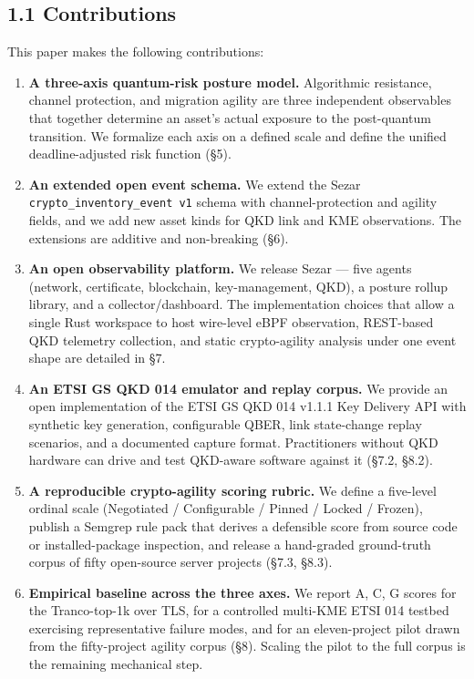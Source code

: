\subsection{1.1 Contributions}\label{contributions}

This paper makes the following contributions:

\begin{enumerate}
\def\labelenumi{\arabic{enumi}.}
\item
  \textbf{A three-axis quantum-risk posture model.} Algorithmic
  resistance, channel protection, and migration agility are three
  independent observables that together determine an asset's actual
  exposure to the post-quantum transition. We formalize each axis on a
  defined scale and define the unified deadline-adjusted risk function
  (§5).
\item
  \textbf{An extended open event schema.} We extend the Sezar
  \texttt{crypto\_inventory\_event\ v1} schema with channel-protection
  and agility fields, and we add new asset kinds for QKD link and KME
  observations. The extensions are additive and non-breaking (§6).
\item
  \textbf{An open observability platform.} We release Sezar --- five
  agents (network, certificate, blockchain, key-management, QKD), a
  posture rollup library, and a collector/dashboard. The implementation
  choices that allow a single Rust workspace to host wire-level eBPF
  observation, REST-based QKD telemetry collection, and static
  crypto-agility analysis under one event shape are detailed in §7.
\item
  \textbf{An ETSI GS QKD 014 emulator and replay corpus.} We provide an
  open implementation of the ETSI GS QKD 014 v1.1.1 Key Delivery API
  with synthetic key generation, configurable QBER, link state-change
  replay scenarios, and a documented capture format. Practitioners
  without QKD hardware can drive and test QKD-aware software against it
  (§7.2, §8.2).
\item
  \textbf{A reproducible crypto-agility scoring rubric.} We define a
  five-level ordinal scale (Negotiated / Configurable / Pinned / Locked
  / Frozen), publish a Semgrep rule pack that derives a defensible score
  from source code or installed-package inspection, and release a
  hand-graded ground-truth corpus of fifty open-source server projects
  (§7.3, §8.3).
\item
  \textbf{Empirical baseline across the three axes.} We report A, C, G
  scores for the Tranco-top-1k over TLS, for a controlled multi-KME ETSI
  014 testbed exercising representative failure modes, and for an
  eleven-project pilot drawn from the fifty-project agility corpus (§8).
  Scaling the pilot to the full corpus is the remaining mechanical step.
\end{enumerate}

